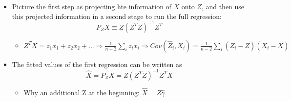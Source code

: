 \documentclass[10pt, oneside]{article}
\begin{document}
\begin{itemize}
    \item Picture the first step as projecting hte information of $X$ onto $Z$, and then use this projected information in a second stage to run the full regression: \[P_Z X\equiv Z(Z^TZ)^{-1} Z^T\]
    \begin{itemize}
        \item $Z^TX = z_1 x_1 + z_2 x_2 + ... \Rightarrow \frac{1}{n-2}\sum_i z_i x_i \Rightarrow Cov(\hat Z_i, X_i ) = \frac{1}{n-2} \sum_i (Z_i -\bar Z) (X_i - \bar X)$
    \end{itemize}
    \item The fitted values of the first regression can be written as \[\hat X= P_ZX = Z(Z^TZ)^{-1} Z^T X\]
    \begin{itemize}
        \item Why an additional Z at the beginning: $\hat X = Z \hat \gamma$
        

\end{itemize}
\end{itemize}
\end{document}
